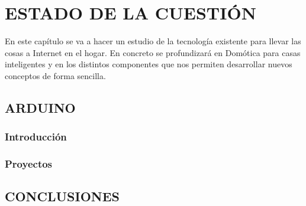 \chapter{ESTADO DE LA CUESTIÓN}

En este capítulo se va a hacer un estudio de la tecnología existente para llevar las cosas a Internet en el hogar. En concreto se profundizará en Domótica para casas inteligentes y en los distintos componentes que nos permiten desarrollar nuevos conceptos de forma sencilla.



\section{ARDUINO}
\subsection{Introducción}
\subsection{Proyectos}
\section{CONCLUSIONES}